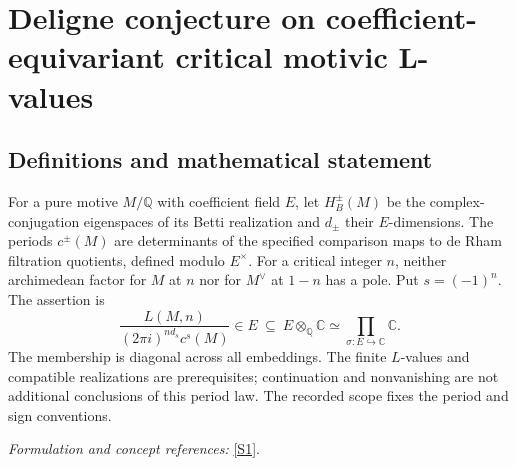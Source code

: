 \documentclass[11pt,a4paper]{article}
\numberwithin{equation}{section}
\newcommand{\Q}{\mathbb{Q}}
\newcommand{\C}{\mathbb{C}}
\newcommand{\sref}[2]{\hyperlink{source:#1:#2}{[S#2]}}
\newif\ifshowcatalogue
\newcommand{\cataloguescope}[1]{\ifshowcatalogue
 \paragraph{Exact scope in the supplied catalogue.}
 \begin{quote}\small #1\end{quote}\fi}
\begin{document}
\setcounter{section}{70}
\section{\texorpdfstring{Deligne conjecture on coefficient-equivariant critical motivic L-values}{Deligne conjecture on coefficient-equivariant critical motivic L-values}}\label{71}
\subsection{Definitions and mathematical statement}
For a pure motive $M/\Q$ with coefficient field $E$, let $H_B^\pm(M)$ be the complex-conjugation eigenspaces of its Betti realization and $d_\pm$ their $E$-dimensions. The periods $c^\pm(M)$ are determinants of the specified comparison maps to de Rham filtration quotients, defined modulo $E^\times$. For a critical integer $n$, neither archimedean factor for $M$ at $n$ nor for $M^\vee$ at $1-n$ has a pole. Put $s=(-1)^n$. The assertion is
\[
 \frac{L(M,n)}{(2\pi i)^{n d_s}c^s(M)}\in E
 \ \subseteq\ E\otimes_{\Q}\C\simeq\prod_{\sigma:E\hookrightarrow\C}\C.
\]
The membership is diagonal across all embeddings. The finite $L$-values and compatible realizations are prerequisites; continuation and nonvanishing are not additional conclusions of this period law. The recorded scope fixes the period and sign conventions.
\par\smallskip\textit{Formulation and concept references:} \sref{71}{1}.
\cataloguescope{For every pure motive M over Q with coefficients in a number field E, in Deligne's geometric realization formalism (Betti, de Rham and compatible l-adic realizations with comparison, dual, tensor and Tate-twist structures), and every critical integer n, the normalized finite L-value vector L(M,n)/((2*pi*i)\textasciicircum{}(n*d\_sign)*c\textasciicircum{}sign(M)) lies in the diagonal E inside E tensor C, where sign=(-1)\textasciicircum{}n and d\_sign=dim\_E H\_B\textasciicircum{}sign(M). Here H\_B\textasciicircum{}sign is the sign eigenspace of complex conjugation, and c\textasciicircum{}sign is the determinant of the Betti/de Rham comparison to the corresponding filtration quotient, computed in E-rational bases and defined modulo E-units as in Deligne1.7/2.6. Critical means that L\_infinity(sigma,M,s) and L\_infinity(sigma,Mdual,1-s) have no pole at s=n for every embedding sigma:E->C (equivalently use Mdual(1) at -s). Use finite, not completed, L-functions with the compatible E-valued local factors of2.2. Analytic continuation giving finite values at the selected critical integer and the source's well-defined compatible realizations/local factors are defining prerequisites, not assertions proved by this period law and not a restriction to cases whose continuation is already known. The simultaneous embedding vector must come from one element of E; unrelated componentwise algebraicity is insufficient. All-zero values are allowed, but mixed zero/nonzero components do not satisfy the diagonal membership. No general nonvanishing or order-of-zero assertion from Deligne2.7 is appended.}
\end{document}
